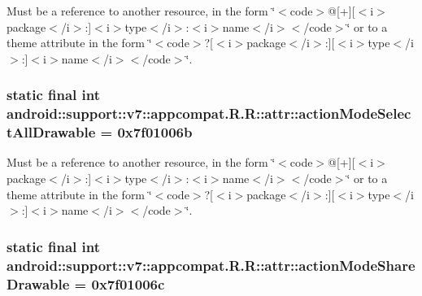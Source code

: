 Must be a reference to another resource, in the form \char`\"{}$<$code$>$@\mbox{[}+\mbox{]}\mbox{[}$<$i$>$package$<$/i$>$:\mbox{]}$<$i$>$type$<$/i$>$:$<$i$>$name$<$/i$>$$<$/code$>$\char`\"{} or to a theme attribute in the form \char`\"{}$<$code$>$?\mbox{[}$<$i$>$package$<$/i$>$:\mbox{]}\mbox{[}$<$i$>$type$<$/i$>$:\mbox{]}$<$i$>$name$<$/i$>$$<$/code$>$\char`\"{}. \hypertarget{classandroid_1_1support_1_1v7_1_1appcompat_1_1_r_1_1attr_cf2d28cf3b3c074b917c8363917eb664}{
\subsubsection[{actionModeSelectAllDrawable}]{\setlength{\rightskip}{0pt plus 5cm}static final int android::support::v7::appcompat.R.R::attr::actionModeSelectAllDrawable = 0x7f01006b}}
\label{classandroid_1_1support_1_1v7_1_1appcompat_1_1_r_1_1attr_cf2d28cf3b3c074b917c8363917eb664}


Must be a reference to another resource, in the form \char`\"{}$<$code$>$@\mbox{[}+\mbox{]}\mbox{[}$<$i$>$package$<$/i$>$:\mbox{]}$<$i$>$type$<$/i$>$:$<$i$>$name$<$/i$>$$<$/code$>$\char`\"{} or to a theme attribute in the form \char`\"{}$<$code$>$?\mbox{[}$<$i$>$package$<$/i$>$:\mbox{]}\mbox{[}$<$i$>$type$<$/i$>$:\mbox{]}$<$i$>$name$<$/i$>$$<$/code$>$\char`\"{}. \hypertarget{classandroid_1_1support_1_1v7_1_1appcompat_1_1_r_1_1attr_0d051690a6dd9197efd2cd7632ce06d5}{
\subsubsection[{actionModeShareDrawable}]{\setlength{\rightskip}{0pt plus 5cm}static final int android::support::v7::appcompat.R.R::attr::actionModeShareDrawable = 0x7f01006c}}
\label{classandroid_1_1support_1_1v7_1_1appcompat_1_1_r_1_1attr_0d051690a6dd9197efd2cd7632ce06d5}


